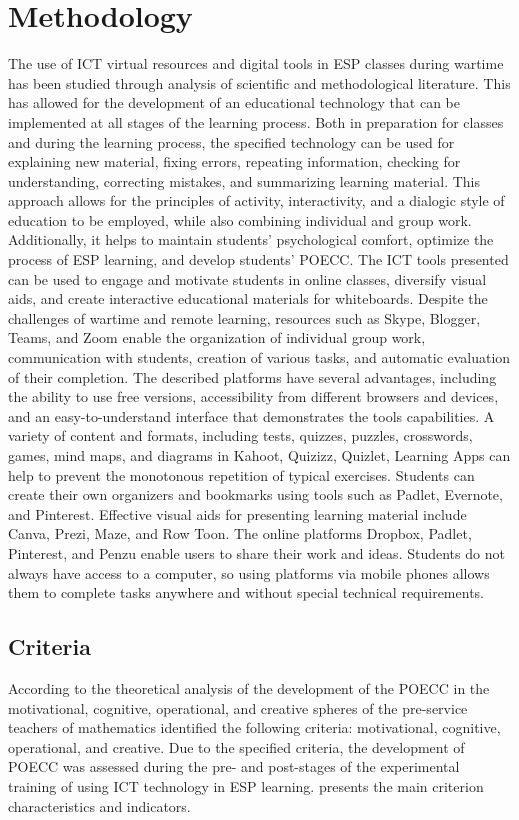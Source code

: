 \section{Methodology}\label{sec-methodology}
The use of ICT virtual resources and digital tools in ESP classes during
wartime has been studied through analysis of scientific and
methodological literature. This has allowed for the development of an
educational technology that can be implemented at all stages of the
learning process. Both in preparation for classes and during the
learning process, the specified technology can be used for explaining
new material, fixing errors, repeating information, checking for
understanding, correcting mistakes, and summarizing learning material.
This approach allows for the principles of activity, interactivity, and
a dialogic style of education to be employed, while also combining
individual and group work. Additionally, it helps to maintain students'
psychological comfort, optimize the process of ESP learning, and develop
students' POECC. The ICT tools presented can be used to engage and
motivate students in online classes, diversify visual aids, and create
interactive educational materials for whiteboards. Despite the
challenges of wartime and remote learning, resources such as Skype,
Blogger, Teams, and Zoom enable the organization of individual group
work, communication with students, creation of various tasks, and
automatic evaluation of their completion. The described platforms have
several advantages, including the ability to use free versions,
accessibility from different browsers and devices, and an
easy-to-understand interface that demonstrates the
tool\textquotesingle s capabilities. A\textbf{ }variety of content and
formats, including tests, quizzes, puzzles, crosswords, games, mind
maps, and diagrams in Kahoot, Quizizz, Quizlet, Learning Apps can
help to prevent the monotonous repetition of typical exercises. Students
can create their own organizers and bookmarks using tools such as
Padlet, Evernote, and Pinterest. Effective visual aids for presenting
learning material include Canva, Prezi, Maze, and Row Toon. The online
platforms Dropbox, Padlet, Pinterest, and Penzu enable users to share
their work and ideas. Students do not always have access to a computer,
so using platforms via mobile phones allows them to complete
tasks anywhere and without special technical requirements.

\subsection{Criteria}\label{subsec-criteria}
According to the theoretical analysis of the development of the POECC in
the motivational, cognitive, operational, and creative spheres of the
pre-service teachers of mathematics identified the following criteria:
motivational, cognitive, operational, and creative. Due to the specified
criteria, the development of POECC was assessed during the pre- and
post-stages of the experimental training of using ICT technology in ESP
learning.  presents the main criterion characteristics and
indicators.

